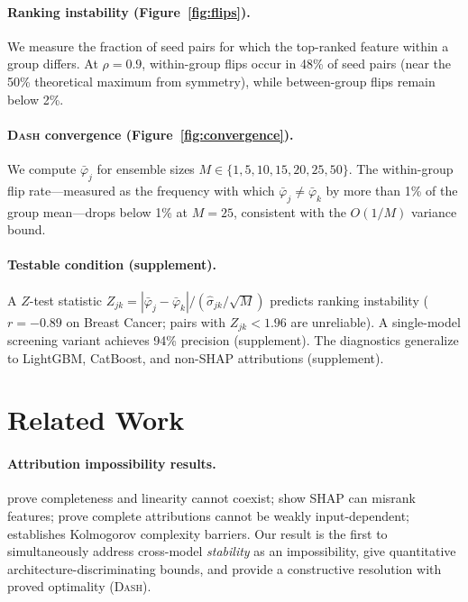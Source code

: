 \documentclass{article}
\newcommand{\DASH}{\textsc{Dash}}
\begin{document}
\paragraph{Ranking instability (Figure~\ref{fig:flips}).}
We measure the fraction of seed pairs for which the top-ranked feature within a group differs.
At $\rho = 0.9$, within-group flips occur in 48\% of seed pairs (near the 50\% theoretical maximum from symmetry), while between-group flips remain below 2\%.

\paragraph{\DASH{} convergence (Figure~\ref{fig:convergence}).}
We compute $\bar{\varphi}_j$ for ensemble sizes $M \in \{1, 5, 10, 15, 20, 25, 50\}$.
The within-group flip rate---measured as the frequency with which $\bar{\varphi}_j \neq \bar{\varphi}_k$ by more than 1\% of the group mean---drops below 1\% at $M = 25$, consistent with the $O(1/M)$ variance bound.

\paragraph{Testable condition (supplement).}
A $Z$-test statistic $Z_{jk} = |\bar\varphi_j - \bar\varphi_k| / (\hat\sigma_{jk}/\sqrt{M})$ predicts ranking instability ($r = -0.89$ on Breast Cancer; pairs with $Z_{jk} < 1.96$ are unreliable).
A single-model screening variant achieves 94\% precision (supplement).
The diagnostics generalize to LightGBM, CatBoost, and non-SHAP attributions (supplement).

\section{Related Work}
\label{sec:related}

\paragraph{Attribution impossibility results.}
\citet{bilodeau2024impossibility} prove completeness and linearity cannot coexist; \citet{huang2024failings} show SHAP can misrank features; \citet{srinivas2019full} prove complete attributions cannot be weakly input-dependent; \citet{rao2025limits} establishes Kolmogorov complexity barriers.
Our result is the first to simultaneously address cross-model \emph{stability} as an impossibility, give quantitative architecture-discriminating bounds, and provide a constructive resolution with proved optimality (\DASH{}).
\end{document}
